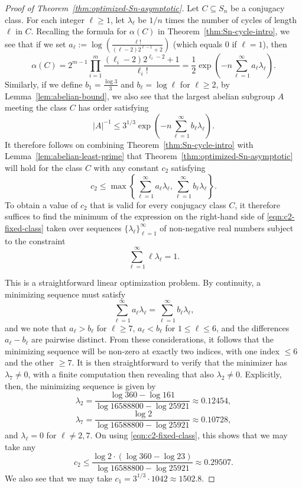 \documentclass[12pt]{amsart}
\theoremstyle{definition} \newtheorem{definition}[theorem]{Definition}
\theoremstyle{example} \newtheorem{example}[theorem]{Example}
\theoremstyle{remark} \newtheorem{remark}{Remark}[theorem]
\numberwithin{equation}{section}
\numberwithin{theorem}{section}
\renewcommand{\leq}{\leqslant}
\renewcommand{\geq}{\geqslant}
\begin{document}
	\begin{proof}[Proof of Theorem~\ref{thm:optimized-Sn-asymptotic}]
		Let $C \subseteq S_n$ be a conjugacy class.  For each integer $\ell \geq 1$, let $\lambda_\ell$ be $1/n$ times the number of cycles of length $\ell$ in $C$.  Recalling the formula for $\alpha(C)$ in Theorem~\ref{thm:Sn-cycle-intro}, we see that if we set $a_\ell := \log\left(\frac{\ell!}{(\ell-2)2^{\ell-1}+2} \right)$ (which equals $0$ if $\ell=1$), then
			\[
				\alpha(C)
					= 2^{m-1} \prod_{i=1}^m \frac{(\ell_i-2)2^{\ell_i-2}+1}{\ell_i!}
					= \frac{1}{2} \exp\left(-n \sum_{\ell=1}^\infty a_\ell\lambda_\ell \right).
			\]
		Similarly, if we define $b_1 = \frac{\log 3}{3}$ and $b_\ell = \log \ell$ for $\ell \geq 2$, by Lemma~\ref{lem:abelian-bound}, we also see that the largest abelian subgroup $A$ meeting the class $C$ has order satisfying
			\[
				|A|^{-1}
					\leq 3^{1/3} \exp\left( -n \sum_{\ell=1}^\infty b_\ell \lambda_\ell\right).
			\]
		It therefore follows on combining Theorem~\ref{thm:Sn-cycle-intro} with Lemma~\ref{lem:abelian-least-prime} that Theorem~\ref{thm:optimized-Sn-asymptotic} will hold for the class $C$ with any constant $c_2$ satisfying
			\begin{equation} \label{eqn:c2-fixed-class}
				c_2 \leq \max\left\{ \sum_{\ell=1}^\infty a_\ell \lambda_\ell, \sum_{\ell=1}^\infty b_\ell \lambda_\ell \right\}.
			\end{equation}
		To obtain a value of $c_2$ that is valid for every conjugacy class $C$, it therefore suffices to find the minimum of the expression on the right-hand side of \eqref{eqn:c2-fixed-class} taken over sequences $\{ \lambda_\ell\}_{\ell=1}^\infty$ of non-negative real numbers subject to the constraint
			\[
				\sum_{\ell=1}^\infty \ell \lambda_\ell = 1.
			\]
		
		This is a straightforward linear optimization problem.  By continuity, a minimizing sequence must satisfy
			\begin{equation} \label{eqn:hyperplane}
				\sum_{\ell=1}^\infty a_\ell \lambda_\ell
					= \sum_{\ell=1}^\infty b_\ell \lambda_\ell,
			\end{equation}
		and we note that $a_\ell > b_\ell$ for $\ell \geq 7$, $a_\ell < b_\ell$ for $1 \leq \ell \leq 6$, and the differences $a_\ell - b_\ell$ are pairwise distinct.  From these considerations, it follows that the minimizing sequence will be non-zero at exactly two indices, with one index $\leq 6$ and the other $\geq 7$.  It is then straightforward to verify that the minimizer has $\lambda_7 \ne 0$, with a finite computation then revealing that also $\lambda_2 \ne 0$.  Explicitly, then, the minimizing sequence is given by
			\[
				\lambda_2 
					= \frac{\log 360 - \log 161}{\log 16588800 - \log 25921}
					\approx 0.12454,
			\]
			\[
				\lambda_7
					= \frac{\log 2}{\log 16588800 - \log 25921} 
					\approx 0.10728,
			\]
		and $\lambda_\ell = 0$ for $\ell \ne 2,7$.  On using \eqref{eqn:c2-fixed-class}, this shows that we may take any
			\[
				c_2 
					\leq \frac{\log 2 \cdot \left(\log 360 - \log 23 \right)}{\log 16588800 - \log 25921} 
					\approx 0.29507.
			\]
		We also see that we may take $c_1 = 3^{1/3} \cdot 1042 \approx 1502.8$.
		

\end{proof}
\end{document}
